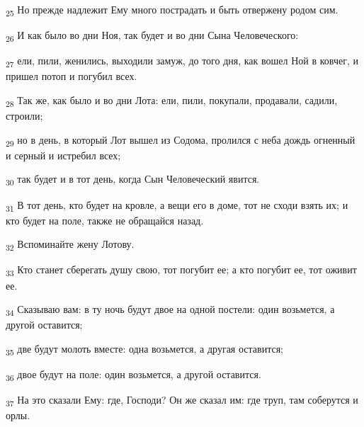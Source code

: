 \begin{tcolorbox}
\textsubscript{25} Но прежде надлежит Ему много пострадать и быть отвержену родом сим.
\end{tcolorbox}
\begin{tcolorbox}
\textsubscript{26} И как было во дни Ноя, так будет и во дни Сына Человеческого:
\end{tcolorbox}
\begin{tcolorbox}
\textsubscript{27} ели, пили, женились, выходили замуж, до того дня, как вошел Ной в ковчег, и пришел потоп и погубил всех.
\end{tcolorbox}
\begin{tcolorbox}
\textsubscript{28} Так же, как было и во дни Лота: ели, пили, покупали, продавали, садили, строили;
\end{tcolorbox}
\begin{tcolorbox}
\textsubscript{29} но в день, в который Лот вышел из Содома, пролился с неба дождь огненный и серный и истребил всех;
\end{tcolorbox}
\begin{tcolorbox}
\textsubscript{30} так будет и в тот день, когда Сын Человеческий явится.
\end{tcolorbox}
\begin{tcolorbox}
\textsubscript{31} В тот день, кто будет на кровле, а вещи его в доме, тот не сходи взять их; и кто будет на поле, также не обращайся назад.
\end{tcolorbox}
\begin{tcolorbox}
\textsubscript{32} Вспоминайте жену Лотову.
\end{tcolorbox}
\begin{tcolorbox}
\textsubscript{33} Кто станет сберегать душу свою, тот погубит ее; а кто погубит ее, тот оживит ее.
\end{tcolorbox}
\begin{tcolorbox}
\textsubscript{34} Сказываю вам: в ту ночь будут двое на одной постели: один возьмется, а другой оставится;
\end{tcolorbox}
\begin{tcolorbox}
\textsubscript{35} две будут молоть вместе: одна возьмется, а другая оставится;
\end{tcolorbox}
\begin{tcolorbox}
\textsubscript{36} двое будут на поле: один возьмется, а другой оставится.
\end{tcolorbox}
\begin{tcolorbox}
\textsubscript{37} На это сказали Ему: где, Господи? Он же сказал им: где труп, там соберутся и орлы.
\end{tcolorbox}
